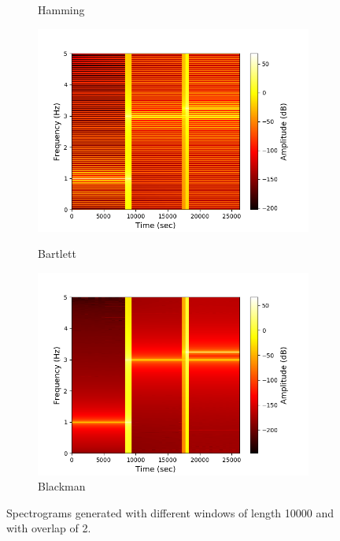 \begin{figure}
\begin{subfigure}{0.49\textwidth}
\caption{Hamming}
\label{fig:stft_hamming}
\end{subfigure}
\begin{subfigure}{0.49\textwidth}
\centering
\includegraphics[width=\textwidth]{figures/stft_windows/bartlett_10000.png}
\caption{Bartlett}
\label{fig:stft_bartlett}
\includegraphics[width=\textwidth]{figures/stft_windows/blackman_10000.png}
\caption{Blackman}
\label{fig:stft_blackman}
\end{subfigure}
\caption{Spectrograms generated with different windows of length 10000 and with overlap of 2.}
\label{fig:stft_windows}
\end{figure}



















